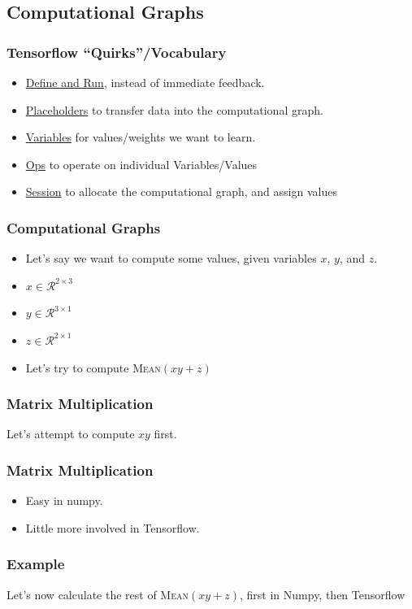 \documentclass{beamer}
\begin{document}
\subsection{Computational Graphs}

\begin{frame}
  \frametitle{Tensorflow ``Quirks''/Vocabulary}
  \begin{itemize}
  \item \underline{Define and Run}, instead of immediate feedback.
  \item \underline{Placeholders} to transfer data into the computational graph.
  \item \underline{Variables} for values/weights we want to learn.
  \item \underline{Ops} to operate on individual Variables/Values
  \item \underline{Session} to allocate the computational graph, and assign values
  \end{itemize}
\end{frame}

\begin{frame}
  \frametitle{Computational Graphs}
  \begin{itemize}
  \item Let's say we want to compute some values, given variables $x$, $y$, and $z$.
  \item $x \in \mathcal{R}^{2 \times 3}$
  \item $y \in \mathcal{R}^{3 \times 1}$
  \item $z \in \mathcal{R}^{2 \times 1}$
  \item Let's try to compute \textsc{Mean}$(xy + z)$
  \end{itemize}
\end{frame}

\begin{frame}
  \frametitle{Matrix Multiplication}
  Let's attempt to compute $xy$ first.
\end{frame}

\begin{frame}
  \frametitle{Matrix Multiplication}
  \begin{itemize}
  \item Easy in numpy.
  \item Little more involved in Tensorflow.
  \end{itemize}
\end{frame}

\begin{frame}
  \frametitle{Example}
  Let's now calculate the rest of \textsc{Mean}$(xy + z)$, first in Numpy, then Tensorflow
\end{frame}
\end{document}
